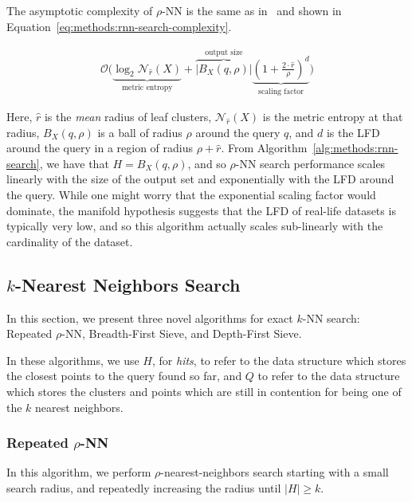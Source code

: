 The asymptotic complexity of $\rho$-NN is the same as in~\cite{ishaq2019clustered} and shown in Equation~\ref{eq:methods:rnn-search-complexity}.

\begin{gather}
    \mathcal{O}
    \Bigg(
        \underbrace{\log_2 \mathcal{N}_{\hat{r}}(X)}_{\textrm{metric entropy}} +
        \overbrace{ \left| B_X(q, \rho) \right|}^{\textrm{output size}}
        \underbrace{ \left( 1 + \frac{2 \cdot \hat{r}}{ \rho} \right) ^ d}_{\textrm{scaling factor}}
    \Bigg)
    \label{eq:methods:rnn-search-complexity}
\end{gather}

Here, $\hat{r}$ is the \textit{mean} radius of leaf clusters, $\mathcal{N}_{\hat{r}}(X)$ is the metric entropy at that radius, $B_X(q, \rho)$ is a ball of radius $\rho$ around the query $q$, and $d$ is the LFD around the query in a region of radius $\rho + \hat{r}$.
From Algorithm~\ref{alg:methods:rnn-search}, we have that $H = B_X(q, \rho)$, and so $\rho$-NN search performance scales linearly with the size of the output set and exponentially with the LFD around the query.
While one might worry that the exponential scaling factor would dominate, the manifold hypothesis suggests that the LFD of real-life datasets is typically very low, and so this algorithm actually scales sub-linearly with the cardinality of the dataset.


\subsection{\texorpdfstring{$k$}{k}-Nearest Neighbors Search}
\label{sec:methods:knn-search}

In this section, we present three novel algorithms for exact $k$-NN search:
Repeated $\rho$-NN, Breadth-First Sieve, and Depth-First Sieve.

In these algorithms, we use $H$, for \emph{hits}, to refer to the data structure which stores the closest points to the query found so far, and $Q$ to refer to the data structure which stores the clusters and points which are still in contention for being one of the $k$ nearest neighbors.


\subsubsection{Repeated \texorpdfstring{$\rho$}{p}-NN}
\label{sec:methods:knn-search:repeated-rnn}

In this algorithm, we perform $\rho$-nearest-neighbors search starting with a small search radius, and repeatedly increasing the radius until $|H| \geq k$.

